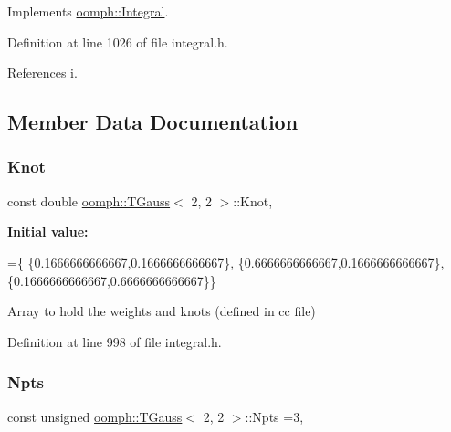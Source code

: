 Implements \hyperlink{classoomph_1_1Integral_ac65335e2aab120b285b3d6c294507b06}{oomph\+::\+Integral}.



Definition at line 1026 of file integral.\+h.



References i.



\subsection{Member Data Documentation}
\mbox{\label{classoomph_1_1TGauss_3_012_00_012_01_4_a4b3ef5fdd2f3d7f9e31c363835ecdbd6}} 
\subsubsection{\texorpdfstring{Knot}{Knot}}
{\footnotesize\ttfamily const double \hyperlink{classoomph_1_1TGauss}{oomph\+::\+T\+Gauss}$<$ 2, 2 $>$\+::Knot\hspace{0.3cm}{\ttfamily [static]}, {\ttfamily [private]}}

{\bfseries Initial value\+:}
\begin{DoxyCode}
=\{
 \{0.1666666666667,0.1666666666667\},
 \{0.6666666666667,0.1666666666667\},
 \{0.1666666666667,0.6666666666667\}\}
\end{DoxyCode}


Array to hold the weights and knots (defined in cc file) 



Definition at line 998 of file integral.\+h.

\mbox{\label{classoomph_1_1TGauss_3_012_00_012_01_4_a8b4cada9b62d5e8ee18fbd7e66780368}} 
\subsubsection{\texorpdfstring{Npts}{Npts}}
{\footnotesize\ttfamily const unsigned \hyperlink{classoomph_1_1TGauss}{oomph\+::\+T\+Gauss}$<$ 2, 2 $>$\+::Npts =3\hspace{0.3cm}{\ttfamily [static]}, {\ttfamily [private]}}



